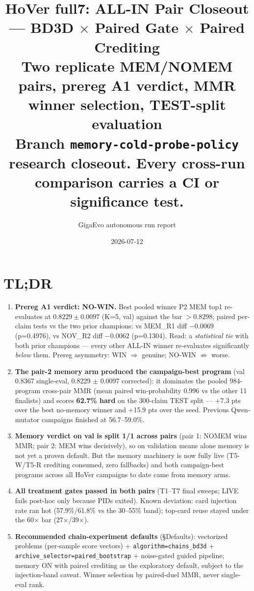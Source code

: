 \documentclass[10pt]{article}
\title{HoVer full7: ALL-IN Pair Closeout --- BD3D $\times$ Paired Gate $\times$ Paired Crediting\\
\large Two replicate MEM/NOMEM pairs, prereg A1 verdict, MMR winner selection, TEST-split evaluation\\
\normalsize Branch \texttt{memory-cold-probe-policy} research closeout. Every cross-run comparison carries a CI or significance test.}
\author{GigaEvo autonomous run report}
\date{2026-07-12}
\begin{document}
\sloppy
\maketitle

\section*{TL;DR}
\begin{enumerate}
\item \textbf{Prereg A1 verdict: \textcolor{warn}{NO-WIN}.}
Best pooled winner P2 MEM top1 re-evaluates at
$0.8229 \pm 0.0097$ (K=5, val)
against the bar $>0.8298$; paired per-claim tests vs the two prior
champions: vs MEM\_R1 diff $-0.0069$ (p=0.4976),
vs NOV\_R2 diff $-0.0062$ (p=0.1304).
Read: a \emph{statistical tie} with both prior champions --- every other ALL-IN
winner re-evaluates significantly \emph{below} them. Prereg asymmetry:
WIN $\Rightarrow$ genuine; NO-WIN $\not\Rightarrow$ worse.
\item \textbf{The pair-2 memory arm produced the campaign-best program} (val
0.8367 single-eval, 0.8229 $\pm$
0.0097 corrected): it dominates the pooled 984-program
cross-pair MMR (mean paired win-probability 0.996 vs the other 11 finalists) and
scores \textbf{62.7\% hard} on the 300-claim TEST split
--- +7.3 pts over the best
no-memory winner and +15.9 pts over
the seed. Previous Qwen-mutator campaigns finished at 56.7--59.0\%.
\item \textbf{Memory verdict on val is split 1/1 across pairs} (pair 1: NOMEM wins
MMR; pair 2: MEM wins decisively), so on validation means alone memory is not yet a
proven default. But the memory machinery is now fully live (T5-W/T5-R crediting
consumed, zero fallbacks) and both campaign-best programs across all HoVer
campaigns to date came from memory arms.
\item \textbf{All treatment gates passed in both pairs} (T1--T7 final sweeps;
LIVE fails post-hoc only because PIDs exited). Known deviation: card injection rate
ran hot (57.9\%/61.8\% vs the 30--55\% band); top-card reuse stayed under the
60$\times$ bar (27$\times$/39$\times$).
\item \textbf{Recommended chain-experiment defaults} (\S Defaults): vectorized
problems (per-sample score vectors) + \texttt{algorithm=chains\_bd3d} +
\texttt{archive\_selector=paired\_bootstrap} + noise-gated guided pipeline;
memory ON with paired crediting as the exploratory default, subject to the
injection-band caveat. Winner selection by paired-duel MMR, never single-eval rank.
\end{enumerate}
\end{document}
